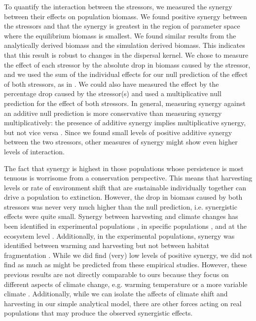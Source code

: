 \documentclass[12pt,english]{article}
\begin{document}
\begin{spacing}{1.9}
\begin{flushleft}
To quantify the interaction between the stressors, we measured the synergy between their effects on population biomass.  We found positive synergy between the stressors and that the synergy is greatest in the region of parameter space where the equilibrium biomass is smallest.  We found similar results from the analytically derived biomass and the simulation derived biomass. This indicates that this result is robust to changes in the dispersal kernel.  We chose to measure the effect of each stressor by the absolute drop in biomass caused by the stressor, and we used the sum of the individual effects for our null prediction of the effect of both stressors, as in \citep{Crainetal2008, DarlingCote2008,Nyeetal2013}.  We could also have measured the effect by the percentage drop caused by the stressor(s) and used a multiplicative null prediction for the effect of both stressors.  In general, measuring synergy against an additive null prediction is more conservative than measuring synergy multiplicatively: the presence of additive synergy implies multiplicative synergy, but not vice versa \citep{Crainetal2008, Foltetal1999}.  Since we found small levels of positive additive synergy between the two stressors, other measures of synergy might show even higher levels of interaction. 

The fact that synergy is highest in those populations whose persistence is most tenuous is worrisome from a conservation perspective.  This means that harvesting levels or rate of environment shift that are sustainable individually together can drive a population to extinction.  However, the drop in biomass caused by both stressors was never very much higher than the null prediction, i.e. synergistic effects were quite small.  Synergy between harvesting and climate changes has been identified in experimental populations \citep{Moraetal2007}, in specific populations \citep{Planque:2010uq}, and at the ecosystem level \citep{Kirby:2009fk,Planque:2010uq}.   Additionally, in the experimental populations, synergy was identified between warming and harvesting but not between habitat fragmentation \citep{Moraetal2007}.    While we did find (very) low levels of positive synergy, we did not find as much as might be predicted from these empirical studies.  However, these previous results are not directly comparable to ours because they focus on different aspects of climate change, e.g. warming temperature \citep{Moraetal2007,Kirby:2009fk} or a more variable climate \citep{Planque:2010uq}.  Additionally, while we can isolate the affects of climate shift and harvesting in our simple analytical model, there are other forces acting on real populations that may produce the observed synergistic effects.


\end{flushleft}
\end{spacing}
\end{document}
